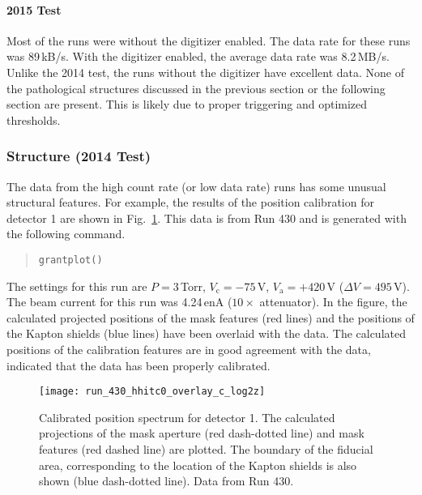 \paragraph{2015 Test}
Most of the runs were without the digitizer enabled. The data rate for these runs was 89\,kB/s. With the digitizer enabled, the average data rate was 8.2\,MB/s. Unlike the 2014 test, the runs without the digitizer have excellent data. None of the pathological structures discussed in the previous section or the following section are present. This is likely due to proper triggering and optimized thresholds.

\subsubsection{Structure (2014 Test)}
The data from the high count rate (or low data rate) runs has some unusual structural features. For example, the results of the position calibration for detector 1 are shown in Fig.~\ref{overlay}. This data is from Run 430 and is generated with the following command.
\vsetroot
\begin{quote}
\begin{Verbatim}[firstnumber=0]
grantplot()
\end{Verbatim}
\end{quote}
\vsetnone
 The settings for this run are $P=3$\,Torr, $V_\textrm{c}=-75$\,V, $V_\textrm{a}=+420$\,V ($\Delta V=495$\,V). The beam current for this run was 4.24\,enA ($10\times$ attenuator). In the figure, the calculated projected positions of the mask features (red lines) and the positions of the Kapton shields (blue lines) have been overlaid with the data. The calculated positions of the calibration features are in good agreement with the data, indicated that the data has been properly calibrated. 

\begin{figure}
\centering
\texttt{[image: run\_430\_hhitc0\_overlay\_c\_log2z]}%
\caption{Calibrated position spectrum for detector 1.  The calculated projections of the mask aperture (red dash-dotted line) and mask features (red dashed line) are plotted. The boundary of the fiducial area, corresponding to the location of the Kapton shields is also shown (blue dash-dotted line). Data from Run 430.}%
\label{overlay}%
\end{figure}

